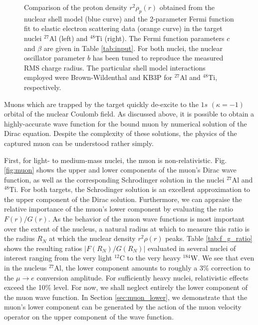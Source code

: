\documentclass{book}[12pt]
\begin{document}
\begin{figure}
\centering
{}
\caption{Comparison of the proton density $r^2\rho_p(r)$ obtained from the nuclear shell model (blue curve) and the 2-parameter Fermi function fit to elastic electron scattering data (orange curve) in the target nuclei $^{27}$Al (left) and $^{48}$Ti (right). The Fermi function parameters $c$ and $\beta$ are given in Table \ref{tab:input}. For both nuclei, the nuclear oscillator parameter $b$ has been tuned to reproduce the measured RMS charge radius. The particular shell model interactions employed were Brown-Wildenthal and KB3P for $^{27}$Al and $^{48}$Ti, respectively.}
\end{figure}

Muons which are trapped by the target quickly de-excite to the $1s$ $(\kappa=-1)$ orbital of the nuclear Coulomb field. As discussed above, it is possible to obtain a highly-accurate wave function for the bound muon by numerical solution of the Dirac equation. Despite the complexity of these solutions, the physics of the captured muon can be understood rather simply. 

First, for light- to medium-mass nuclei, the muon is non-relativistic. Fig. \ref{fig:muon} shows the upper and lower components of the muon's Dirac wave function, as well as the corresponding Schrodinger solution in the nuclei $^{27}$Al and $^{48}$Ti. For both targets, the Schrodinger solution is an excellent approximation to the upper component of the Dirac solution. Furthermore, we can appraise the relative importance of the muon's lower component by evaluating the ratio $F(r)/G(r)$. As the behavior of the muon wave functions is most important over the extent of the nucleus, a natural radius at which to measure this ratio is the radius $R_N$ at which the nuclear density $r^2\rho(r)$ peaks. Table \ref{tab:f_g_ratio} shows the resulting ratios $|F(R_N)/G(R_N)|$ evaluated in several nuclei of interest ranging from the very light $^{12}$C to the very heavy $^{184}$W. We see that even in the nucleus $^{27}$Al, the lower component amounts to roughly a $3\%$ correction to the $\mu\rightarrow e$ conversion amplitude. For sufficiently heavy nuclei, relativistic effects exceed the 10\% level. For now, we shall neglect entirely the lower component of the muon wave function. In Section \ref{sec:muon_lower}, we demonstrate that the muon's lower component can be generated by the action of the muon velocity operator on the upper component of the wave function. 
\end{document}
